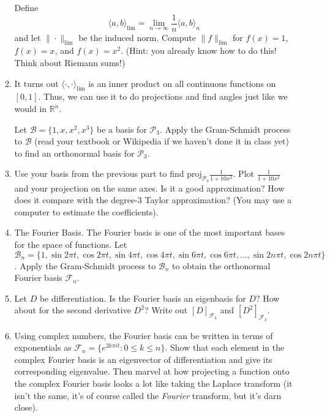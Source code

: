 \documentclass[letter]{article}
\newcommand{\R}{\mathbb{R}}
\newcommand{\proj}{\mathrm{proj}}
\begin{document}
\begin{enumerate}
\begin{enumerate}
					Define
					\[
						\langle a,b\rangle_{\lim} = \lim_{n\to\infty} \frac{1}{n}\langle a,b\rangle_n
					\]
					and let $\|\cdot\|_{\lim}$ be the induced norm.  Compute $\|f\|_{\lim}$ 
					for $f(x)=1$, $f(x)=x$, and $f(x)=x^2$.  (Hint: you already know how to do this!  Think
					about Riemann sums!)
				\item It turns out $\langle \cdot,\cdot\rangle_{\lim}$ is an inner product on all continuous
					functions on $[0,1]$.  Thus, we can use it to do projections and find angles just
					like we would in $\R^n$.  

					Let $\mathcal B=\{1,x,x^2,x^3\}$ be a basis for $\mathcal P_3$.  Apply the Gram-Schmidt process
					to $\mathcal B$ (read your textbook or Wikipedia if we haven't done it in class yet) to
					find an orthonormal basis for $\mathcal P_3$.
				\item Use your basis from the previous part to find $\proj_{\mathcal P_3} \tfrac{1}{1+10x^2}$.  Plot
					$\tfrac{1}{1+10x^2}$ and your projection on the same axes.  Is it a good approximation?  How
					does it compare with the degree-3 Taylor approximation? (You may use a computer
					to estimate the coefficients).

				\item {\sc The Fourier Basis}.  The Fourier basis is one of the most important bases for
					the space of functions.  Let $\mathcal B_n=\{1,\sin 2\pi t,\cos 2\pi t,\sin 4\pi t,\cos 4\pi t,\sin 6\pi t,\cos 6\pi t,
					\ldots, \sin 2n\pi t,\cos 2n\pi t\}$.  Apply the Gram-Schmidt process to $\mathcal B_n$
					to obtain the orthonormal Fourier basis $\mathcal F_n$.
				\item Let $D$ be differentiation.  Is the Fourier basis an eigenbasis for $D$?  How
					about for the second derivative $D^2$? Write out 
					$[D]_{\mathcal F_3}$ and $[D^2]_{\mathcal F_3}$.
				\item Using complex numbers, the Fourier basis can be written in terms of exponentials
					as $\mathcal F_n=\{ e^{2k\pi i t}: 0\leq k\leq n\}$.  Show that each element in
					the complex Fourier basis is an eigenvector of differentiation and give its
					corresponding eigenvalue.  Then marvel at how projecting a function onto the complex
					Fourier basis looks a lot like taking the Laplace transform (it isn't the same, it's
					of course called the \emph{Fourier} transform, but it's darn close).
			\end{enumerate}


\end{enumerate}
\end{document}
